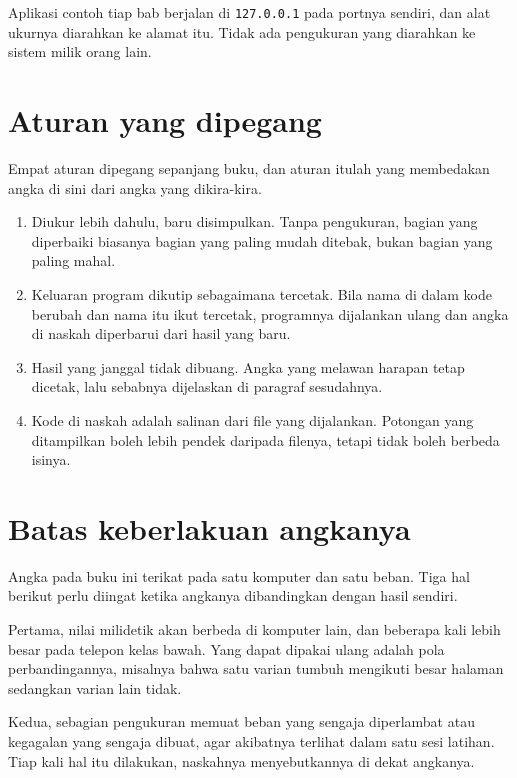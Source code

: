 Aplikasi contoh tiap bab berjalan di \texttt{127.0.0.1} pada portnya
sendiri, dan alat ukurnya diarahkan ke alamat itu. Tidak ada pengukuran yang
diarahkan ke sistem milik orang lain.

\section*{Aturan yang dipegang}

Empat aturan dipegang sepanjang buku, dan aturan itulah yang membedakan
angka di sini dari angka yang dikira-kira.

\begin{enumerate}
  \item Diukur lebih dahulu, baru disimpulkan. Tanpa pengukuran, bagian yang
        diperbaiki biasanya bagian yang paling mudah ditebak, bukan bagian
        yang paling mahal.
  \item Keluaran program dikutip sebagaimana tercetak. Bila nama di dalam
        kode berubah dan nama itu ikut tercetak, programnya dijalankan ulang
        dan angka di naskah diperbarui dari hasil yang baru.
  \item Hasil yang janggal tidak dibuang. Angka yang melawan harapan tetap
        dicetak, lalu sebabnya dijelaskan di paragraf sesudahnya.
  \item Kode di naskah adalah salinan dari file yang dijalankan. Potongan
        yang ditampilkan boleh lebih pendek daripada filenya, tetapi tidak
        boleh berbeda isinya.
\end{enumerate}

\section*{Batas keberlakuan angkanya}

Angka pada buku ini terikat pada satu komputer dan satu beban. Tiga hal
berikut perlu diingat ketika angkanya dibandingkan dengan hasil sendiri.

Pertama, nilai milidetik akan berbeda di komputer lain, dan beberapa kali
lebih besar pada telepon kelas bawah. Yang dapat dipakai ulang adalah pola
perbandingannya, misalnya bahwa satu varian tumbuh mengikuti besar halaman
sedangkan varian lain tidak.

Kedua, sebagian pengukuran memuat beban yang sengaja diperlambat atau
kegagalan yang sengaja dibuat, agar akibatnya terlihat dalam satu sesi
latihan. Tiap kali hal itu dilakukan, naskahnya menyebutkannya di dekat
angkanya.

